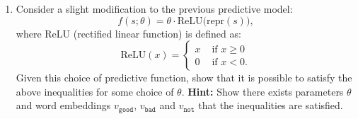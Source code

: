 \begin{enumerate}
    \item  Consider a slight modification to the previous predictive model: 
        $$ 
            f(s; \theta) = \theta \cdot \text{ReLU}\big( \text{repr}(s) \big), 
        $$
        where ReLU (rectified linear function) is defined as: 
        $$
            \text{ReLU}(x) = 
            \begin{cases}
                x & \text{ if } x \geq 0  \\ 
                0 & \text{ if } x < 0.
            \end{cases}
        $$
        Given this choice of predictive function, show that it is possible to satisfy the above inequalities for some choice of $\theta$. 
        \textbf{Hint:} Show there exists parameters $\theta$ and word embeddings $v_\texttt{good}$, $v_\texttt{bad}$ and $v_\texttt{not}$ that the inequalities are satisfied. \\ 
\end{enumerate}
